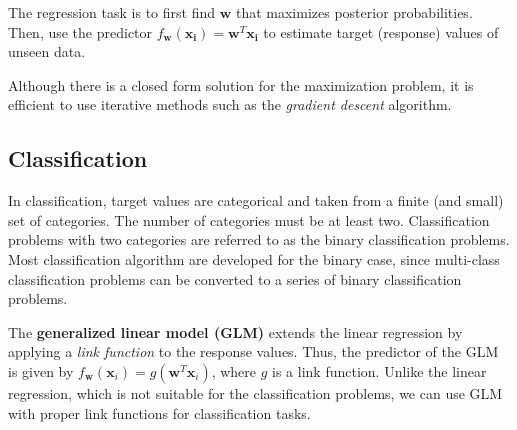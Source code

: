 \documentclass[11pt]{article}
\begin{document}
The regression task is to first find \(\boldsymbol{w}\) that maximizes posterior probabilities. Then, use the predictor \(f_{\boldsymbol{w}}(\boldsymbol{x_i})=\boldsymbol{w}^T\boldsymbol{x_i}\) to estimate target (response) values of unseen data.

Although there is a closed form solution for the maximization problem, it is efficient to use iterative methods such as the \emph{gradient descent} algorithm.

\subsection{Classification}
\label{sec:orgheadline4}
In classification, target values are categorical and taken from a finite (and small) set of categories. The number of categories must be at least two. Classification problems with two categories are referred to as the binary classification problems. Most classification algorithm are developed for the binary case, since multi-class classification problems can be converted to a series of binary classification problems. 

The \textbf{generalized linear model (GLM)} extends the linear regression by applying a \emph{link function} to the response values. Thus, the predictor of the GLM is given by \(f_{\boldsymbol{w}}(\boldsymbol{x}_i)=g(\boldsymbol{w}^T\boldsymbol{x}_i)\), where \(g\) is a link function. Unlike the linear regression, which is not suitable for the classification problems, we can use GLM with proper link functions for classification tasks. 
\end{document}

